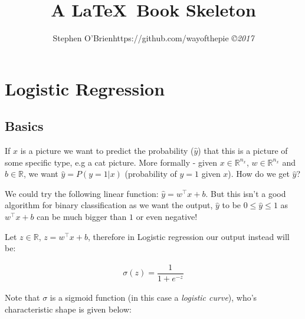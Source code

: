 \documentclass[12pt,reqno]{book}      %
\title{A \LaTeX \ Book Skeleton  }
\author{\htmladdnormallink           %
{Stephen O'Brien}{https://github.com/wayofthepie}
{\small\em \copyright 2017 }}
\date{ }
\begin{document}
\maketitle
{}
\tableofcontents

\chapter{Logistic Regression}
\section{Basics}
If $x$ is a picture we want to predict the probability ($\hat{y}$) that this is a picture of some specific type, e.g a cat picture. More formally - given $x \in \mathbb{R}^{n_{x}}$, $w \in \mathbb{R}^{n_{x}}$ and 
$b \in \mathbb{R}$, we want $\hat{y} = P(y=1 | x)$ (probability of $y = 1$ given $x$). How do we get $\hat{y}$?

We could try the following linear function: $\hat{y} = w^\intercal x + b$. But this isn't a good algorithm for binary classification as we want the output, $\hat{y}$ to be $0 \leq \hat{y} \leq 1$ as $w^\intercal x + b$ can be much bigger than $1$ or even negative!

Let $z \in \mathbb{R}$,  $z = w^\intercal x + b$, therefore in Logistic regression our output instead will be:

\begin{align}
\sigma(z) = \dfrac{1}{1 + e^{-z}}
\end{align}

Note that $\sigma$ is a sigmoid function (in this case a \textit{logistic curve}), who's characteristic shape is given below:

\begin{center}
\end{center}
\end{document}
